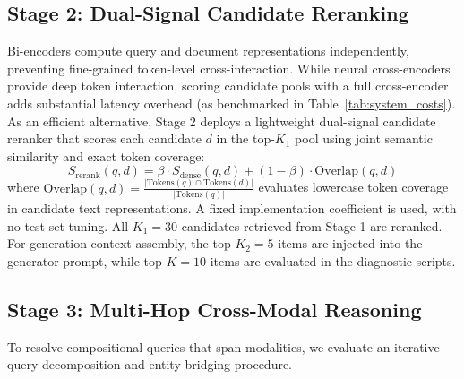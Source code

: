 \documentclass[conference]{IEEEtran}
\begin{document}
\subsection{Stage 2: Dual-Signal Candidate Reranking}
Bi-encoders compute query and document representations independently, preventing fine-grained token-level cross-interaction. While neural cross-encoders provide deep token interaction, scoring candidate pools with a full cross-encoder adds substantial latency overhead (as benchmarked in Table~\ref{tab:system_costs}). As an efficient alternative, Stage 2 deploys a lightweight dual-signal candidate reranker that scores each candidate $d$ in the top-$K_1$ pool using joint semantic similarity and exact token coverage:
\begin{equation}
    S_{\text{rerank}}(q, d) = \beta \cdot S_{\text{dense}}(q, d) + (1 - \beta) \cdot \text{Overlap}(q, d)
\end{equation}
where $\text{Overlap}(q, d) = \frac{|\text{Tokens}(q) \cap \text{Tokens}(d)|}{|\text{Tokens}(q)|}$ evaluates lowercase token coverage in candidate text representations. A fixed implementation coefficient is used, with no test-set tuning. All $K_1 = 30$ candidates retrieved from Stage 1 are reranked. For generation context assembly, the top $K_2 = 5$ items are injected into the generator prompt, while top $K = 10$ items are evaluated in the diagnostic scripts.

\subsection{Stage 3: Multi-Hop Cross-Modal Reasoning}
To resolve compositional queries that span modalities, we evaluate an iterative query decomposition and entity bridging procedure.
\end{document}
